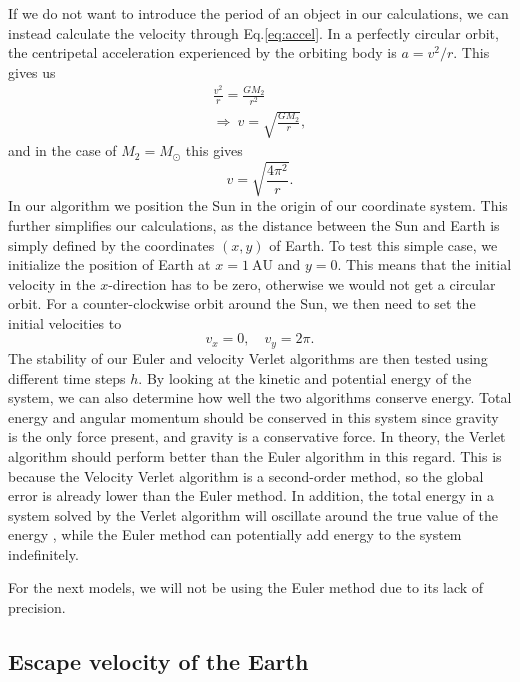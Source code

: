 \documentclass{emulateapj}
\begin{document}
If we do not want to introduce the period of an object in our calculations, we can instead calculate the velocity through Eq.\eqref{eq:accel}. In a perfectly circular orbit, the centripetal acceleration experienced by the orbiting body is $a = v^2/r$. This gives us
%
\begin{gather*}
    \frac{v^2}{r} = \frac{GM_2}{r^2} \\
    \Rightarrow \ v = \sqrt{\frac{G M_2}{r}},
\end{gather*}
%
and in the case of $M_2 = M_\odot$ this gives
%
\begin{equation}\label{eq:circularorbit}
    v = \sqrt{\frac{4\pi^2}{r}}.
\end{equation}
%
In our algorithm we position the Sun in the origin of our coordinate system. This further simplifies our calculations, as the distance between the Sun and Earth is simply defined by the coordinates $(x, y)$ of Earth. To test this simple case, we initialize the position of Earth at $x = 1 \ \textrm{AU}$ and $y = 0$. This means that the initial velocity in the $x$-direction has to be zero, otherwise we would not get a circular orbit. For a counter-clockwise orbit around the Sun, we then need to set the initial velocities to
%
\begin{equation*}
    v_x = 0, \quad v_y = 2\pi.
\end{equation*}
%
The stability of our Euler and velocity Verlet algorithms are then tested using different time steps $h$. By looking at the kinetic and potential energy of the system, we can also determine how well the two algorithms conserve energy. Total energy and angular momentum should be conserved in this system since gravity is the only force present, and gravity is a conservative force. In theory, the Verlet algorithm should perform better than the Euler algorithm in this regard. This is because the Velocity Verlet algorithm is a second-order method, so the global error is already lower than the Euler method. In addition, the total energy in a system solved by the Verlet algorithm will oscillate around the true value of the energy \cite{bib:verlet}, while the Euler method can potentially add energy to the system indefinitely.

For the next models, we will not be using the Euler method due to its lack of precision.

\subsection{Escape velocity of the Earth}
\end{document}
